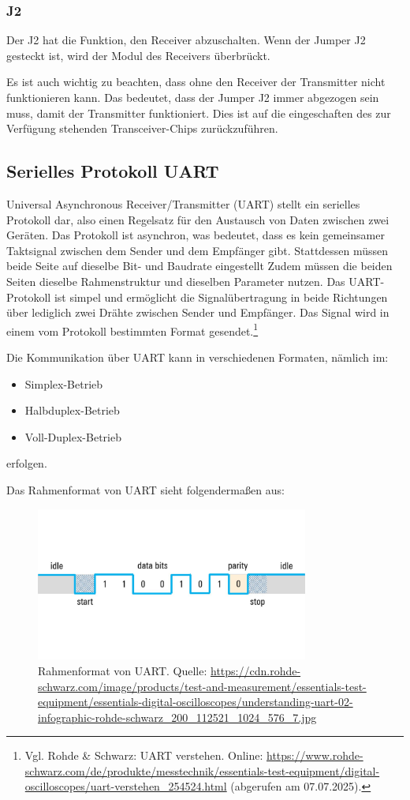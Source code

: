 \subsubsection{J2}
Der J2 hat die Funktion, den Receiver abzuschalten. Wenn der Jumper J2 gesteckt ist, wird der Modul des Receivers überbrückt. 

Es ist auch wichtig zu beachten, dass ohne den Receiver der Transmitter nicht funktionieren kann. Das bedeutet, dass der Jumper J2 immer abgezogen sein muss, damit der Transmitter funktioniert. Dies ist auf die eingeschaften des zur Verfügung stehenden Transceiver-Chips zurückzuführen.

\subsection{Serielles Protokoll UART}
Universal Asynchronous Receiver/Transmitter (UART) stellt ein serielles Protokoll dar, also einen Regelsatz für den Austausch von Daten zwischen zwei Geräten. Das Protokoll ist asynchron, was bedeutet, dass es kein gemeinsamer Taktsignal zwischen dem Sender und dem Empfänger gibt. Stattdessen müssen beide Seite auf dieselbe Bit- und Baudrate eingestellt
Zudem müssen die beiden Seiten dieselbe Rahmenstruktur und dieselben Parameter nutzen. Das UART-Protokoll ist simpel und ermöglicht die Signalübertragung in beide Richtungen über lediglich zwei Drähte zwischen Sender und Empfänger. Das Signal wird in einem vom Protokoll bestimmten Format gesendet.\footnote{Vgl. Rohde \& Schwarz: UART verstehen. Online: \url{https://www.rohde-schwarz.com/de/produkte/messtechnik/essentials-test-equipment/digital-oscilloscopes/uart-verstehen_254524.html} (abgerufen am 07.07.2025).} 

Die Kommunikation über UART kann in verschiedenen Formaten, nämlich im:
\begin{itemize}
    \item Simplex-Betrieb
    \item Halbduplex-Betrieb
    \item Voll-Duplex-Betrieb
\end{itemize}
erfolgen.

Das Rahmenformat von UART sieht folgendermaßen aus:
\begin{figure}[H]
    \centering
    \includegraphics[width=0.8\textwidth]{Pictures/UART-Frame.jpg}
    \caption{Rahmenformat von UART. Quelle: \url{https://cdn.rohde-schwarz.com/image/products/test-and-measurement/essentials-test-equipment/essentials-digital-oscilloscopes/understanding-uart-02-infographic-rohde-schwarz_200_112521_1024_576_7.jpg}}
    \label{fig:UART-Frame}
\end{figure}

